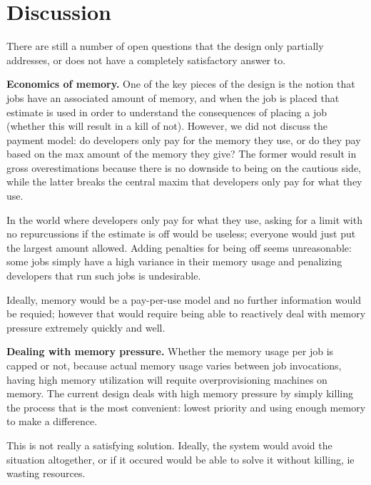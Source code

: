 \section{Discussion}



There are still a number of open questions that the design only partially
addresses, or does not have a completely satisfactory answer to.

\textbf{Economics of memory.}
One of the key pieces of the design is the notion that jobs have an associated
amount of memory, and when the job is placed that estimate is used in order to
understand the consequences of placing a job (whether this will result in a kill
of not). However, we did not discuss the payment model: do developers only pay
for the memory they use, or do they pay based on the max amount of the memory
they give? The former would result in gross overestimations because there is no
downside to being on the cautious side, while the latter breaks the central
maxim that developers only pay for what they use.

In the world where developers only pay for what they use, asking for a limit
with no repurcussions if the estimate is off would be useless; everyone would
just put the largest amount allowed. Adding penalties for being off seems
unreasonable: some jobs simply have a high variance in their memory usage and
penalizing developers that run such jobs is undesirable. 

Ideally, memory would be a pay-per-use model and no further information would be
requied; however that would require being able to reactively deal with memory
pressure extremely quickly and well.

\textbf{Dealing with memory pressure.}
Whether the memory usage per job is capped or not, because actual memory usage
varies between job invocations, having high memory utilization will requite
overprovisioning machines on memory. The current design deals with high memory
pressure by simply killing the process that is the most convenient: lowest
priority and using enough memory to make a difference.

This is not really a satisfying solution. Ideally, the system would avoid the
situation altogether, or if it occured would be able to solve it without
killing, ie wasting resources. 


